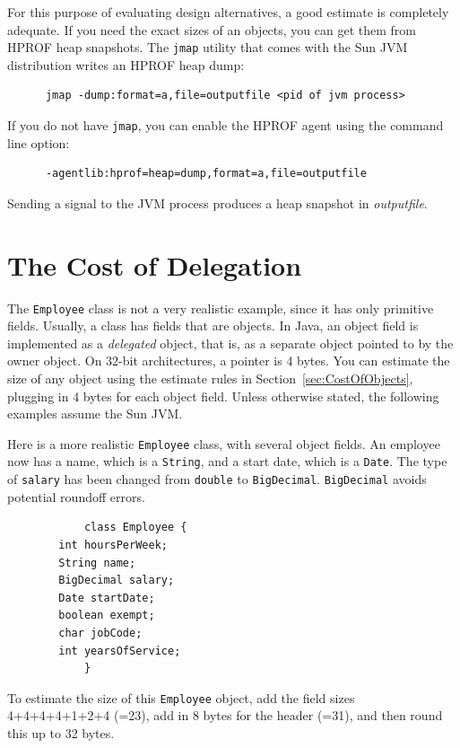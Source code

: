 For this purpose of evaluating design alternatives, a good estimate is completely adequate. If you need the exact sizes of an objects, you can get them from HPROF heap snapshots. The \texttt{jmap} utility that comes with the Sun JVM distribution writes an HPROF heap dump:
\ttfamily
\begin{verbatim} 
      jmap -dump:format=a,file=outputfile <pid of jvm process> 
\end{verbatim}
If you do not have \texttt{jmap}, you can enable the HPROF agent using the command line option: 
\ttfamily
\begin{verbatim} 
      -agentlib:hprof=heap=dump,format=a,file=outputfile
\end{verbatim}
\normalfont
Sending a signal to the JVM process produces a heap snapshot in \textit{outputfile}.


\section{The Cost of Delegation}

The \texttt{Employee} class is not a very realistic example, since it has only primitive fields. Usually, a class has fields that are objects.  In Java, an object field is implemented as a \textit{delegated} object, that is, as a separate object pointed to by the owner object. On 32-bit architectures, a pointer is 4 bytes. You can estimate the size of any object using the estimate rules in Section~\ref{sec:CostOfObjects}, plugging in 4 bytes for each object field. Unless otherwise stated, the following examples assume the Sun JVM. 
\begin{example}
Here is a more realistic \texttt{Employee} class, with several object fields. An employee now has a name, which is a \texttt{String}, and a start date, which is a \texttt{Date}. The type of \texttt{salary} has been changed from \texttt{double} to \texttt{BigDecimal}. \texttt{BigDecimal} avoids potential roundoff errors.
\ttfamily
\begin{verbatim} 
			class Employee {
        int hoursPerWeek;
        String name;
        BigDecimal salary;
        Date startDate;
        boolean exempt;
        char jobCode;
        int yearsOfService;
			}
\end{verbatim}
\normalfont
To estimate the size of this \texttt{Employee} object, add the field sizes 4+4+4+4+1+2+4 (=23), add in 8 bytes for the header (=31), and then round this up to 32 bytes. 
\end{example}


